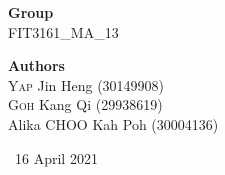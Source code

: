 \begin{titlepage}
	{\large\textbf{Group}}\\
	FIT3161\_MA\_13 \\
	
	\vfill
	
	{\large\textbf{Authors}}\\
	\textsc{Yap} Jin Heng (30149908) \\
	\textsc{Goh} Kang Qi (29938619) \\
	Alika \textsc{CHOO} Kah Poh (30004136)
	
	
	\vfill\vfill\vfill %
	
	{\large\ 16 April 2021} %
	
	
	 
	
	\vfill %
	
\end{titlepage}



